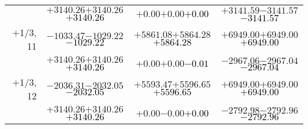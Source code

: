 \documentclass[compress]{beamer}
\begin{document}
\begin{frame}
{\begin{tabular}{r | c | c | c}
           & $+3140.26$\hspace{0.1 cm}$+3140.26$\hspace{0.1 cm}\textcolor{black}{$+3140.26$} & $+0.00$\hspace{0.1 cm}$+0.00$\hspace{0.1 cm}\textcolor{black}{$+0.00$} & $+3141.59$\hspace{0.1 cm}$-3141.57$\hspace{0.1 cm}\textcolor{black}{$-3141.57$} \\
$+$1/3, 11 & $-1033.47$\hspace{0.1 cm}$-1029.22$\hspace{0.1 cm}\textcolor{black}{$-1029.22$} & $+5861.08$\hspace{0.1 cm}$+5864.28$\hspace{0.1 cm}\textcolor{black}{$+5864.28$} & $+6949.00$\hspace{0.1 cm}$+6949.00$\hspace{0.1 cm}\textcolor{black}{$+6949.00$} \\
           & $+3140.26$\hspace{0.1 cm}$+3140.26$\hspace{0.1 cm}\textcolor{black}{$+3140.26$} & $+0.00$\hspace{0.1 cm}$+0.00$\hspace{0.1 cm}\textcolor{black}{$-0.01$} & $-2967.06$\hspace{0.1 cm}$-2967.04$\hspace{0.1 cm}\textcolor{black}{$-2967.04$} \\
$+$1/3, 12 & $-2036.31$\hspace{0.1 cm}$-2032.05$\hspace{0.1 cm}\textcolor{black}{$-2032.05$} & $+5593.47$\hspace{0.1 cm}$+5596.65$\hspace{0.1 cm}\textcolor{black}{$+5596.65$} & $+6949.00$\hspace{0.1 cm}$+6949.00$\hspace{0.1 cm}\textcolor{black}{$+6949.00$} \\
           & $+3140.26$\hspace{0.1 cm}$+3140.26$\hspace{0.1 cm}\textcolor{black}{$+3140.26$} & $+0.00$\hspace{0.1 cm}$-0.00$\hspace{0.1 cm}\textcolor{black}{$+0.00$} & $-2792.98$\hspace{0.1 cm}$-2792.96$\hspace{0.1 cm}\textcolor{black}{$-2792.96$} \\
\end{tabular}}
\end{frame}
\end{document}
